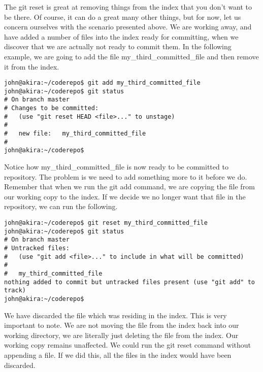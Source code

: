 The git reset is great at removing things from the index that you don't want to be there.  Of course, it can do a great many other things, but for now, let us concern ourselves with the scenario presented above.  We are working away, and have added a number of files into the index ready for committing, when we discover that we are actually not ready to commit them.  In the following example, we are going to add the file my\_third\_committed\_file and then remove it from the index.

\begin{Verbatim}[frame=single,fontsize=\relsize{-3}] 
john@akira:~/coderepo$ git add my_third_committed_file
john@akira:~/coderepo$ git status
# On branch master
# Changes to be committed:
#   (use "git reset HEAD <file>..." to unstage)
#
#	new file:   my_third_committed_file
#
john@akira:~/coderepo$ 
\end{Verbatim} 

Notice how my\_third\_committed\_file is now ready to be committed to repository.  The problem is we need to add something more to it before we do.  Remember that when we run the git add command, we are copying the file from our working copy to the index.  If we decide we no longer want that file in the repository, we can run the following.  

\begin{Verbatim}[frame=single,fontsize=\relsize{-3}] 
john@akira:~/coderepo$ git reset my_third_committed_file
john@akira:~/coderepo$ git status
# On branch master
# Untracked files:
#   (use "git add <file>..." to include in what will be committed)
#
#	my_third_committed_file
nothing added to commit but untracked files present (use "git add" to track)
john@akira:~/coderepo$ 
\end{Verbatim}

We have discarded the file which was residing in the index.  This is very important to note.  We are not moving the file from the index back into our working directory, we are literally just deleting the file from the index.  Our working copy remains unaffected.  We could run the git reset command without appending a file.  If we did this, all the files in the index would have been discarded.  

